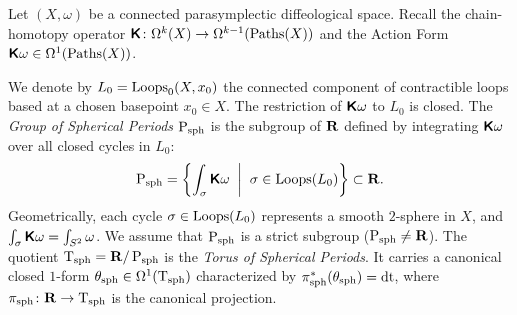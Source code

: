 \documentclass[11pt,reqno,letterpaper,twoside]{amsart}
\begin{document}
  \begin{article}
    \label{art:The Spherical Periods}
    
    Let $(X, \omega)$ be a connected parasymplectic diffeological space.
    Recall the chain-homotopy operator $\boldsymbol{\mathsf{K}} \colon \Omega^k(X) \to \Omega^{k-1}(\operatorname{Paths}(X))$ and the Action Form $\boldsymbol{\mathsf{K}}\omega \in \Omega^1(\operatorname{Paths}(X))$.
    
    We denote by $L_0 = \operatorname{Loops}_0(X, x_0)$ the connected component of contractible loops based at a chosen basepoint $x_0 \in X$.
    The restriction of $\boldsymbol{\mathsf{K}}\omega$ to $L_0$ is closed.
    The \emph{Group of Spherical Periods} $\operatorname{P}_{\mathrm{sph}}$ is the subgroup of ${\mathbf{R}}$ defined by integrating $\boldsymbol{\mathsf{K}}\omega$ over all closed cycles in $L_0$:
    \[
      \operatorname{P}_{\mathrm{sph}} = \left\{ \int_\sigma \boldsymbol{\mathsf{K}}\omega \;\;\bigg|\;\; \sigma \in \operatorname{Loops}(L_0) \right\} \subset {\mathbf{R}}.
      \]
    Geometrically,
    each cycle $\sigma \in \operatorname{Loops}(L_0)$ represents a smooth $2$-sphere in $X$,
    and $\int_\sigma \boldsymbol{\mathsf{K}}\omega = \int_{S^2} \omega$.
    We assume that $\operatorname{P}_{\mathrm{sph}}$ is a strict subgroup ($\operatorname{P}_{\mathrm{sph}} \neq {\mathbf{R}}$).
    The quotient $\mathrm{T}_{\mathrm{sph}} = {\mathbf{R}}/\operatorname{P}_{\mathrm{sph}}$
    is the \emph{Torus of Spherical Periods}.
    It carries a canonical closed $1$-form $\theta_{\mathrm{sph}} \in \Omega^1(\mathrm{T}_{\mathrm{sph}})$ characterized by $\pi_{\mathrm{sph}}^*(\theta_{\mathrm{sph}}) = \mathrm{dt}$,
    where $\pi_{\mathrm{sph}} \colon {\mathbf{R}} \to \mathrm{T}_{\mathrm{sph}}$ is the canonical projection.
  \end{article}
  
\end{document}
